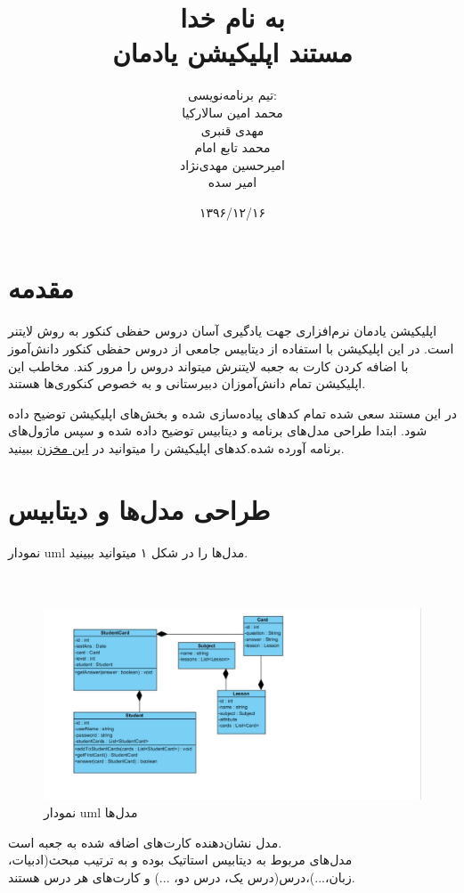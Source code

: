 \documentclass[11pt]{article}
\title{%
به نام خدا%
\\[1cm]
مستند اپلیکیشن یادمان}
\author{تیم برنامه‌نویسی:\\
محمد امین سالارکیا\\
   مهدی قنبری\\
   محمد تابع امام\\
   امیرحسین مهدی‌نژاد\\
   امیر سده}
\date{۱۳۹۶/۱۲/۱۶}
\begin{document}
\maketitle

\section{مقدمه}

اپلیکیشن یادمان نرم‌افزاری جهت یادگیری آسان دروس حفظی کنکور به روش لایتنر است. در این اپلیکیشن با استفاده از دیتابیس جامعی از دروس حفظی کنکور دانش‌آموز با اضافه کردن کارت به جعبه لایتنرش میتواند دروس را مرور کند. مخاطب این اپلیکیشن تمام دانش‌آموزان دبیرستانی و به خصوص کنکوری‌ها هستند.\par
در این مستند سعی شده تمام کدهای پیاده‌سازی شده و بخش‌های اپلیکیشن توضیح داده شود. ابتدا طراحی مدل‌های برنامه و دیتابیس توضیح داده شده و سپس ماژول‌های برنامه آورده شده.کد‌های اپلیکیشن را میتوانید در 
\href{https://github.com/M-amin-s/Yademan}{این مخزن}
ببینید.

\section{طراحی مدل‌ها و دیتابیس}
نمودار uml مدل‌ها را در شکل ۱ میتوانید ببینید.\\\\\\
\begin{figure}[h]
    \centering
    \includegraphics[width=1.5\textwidth]{uml_diagram}
    \caption{نمودار uml مدل‌ها}
    \label{شکل:نمودار uml}
\end{figure}

مدل  نشان‌دهنده کارت‌های اضافه شده به جعبه است.\\ مدل‌های
 مربوط به دیتابیس استاتیک بوده و به ترتیب مبحث(ادبیات، زبان،...)،درس(درس یک، درس دو، ...) و کارت‌های هر درس هستند.\\
 
\end{document}
